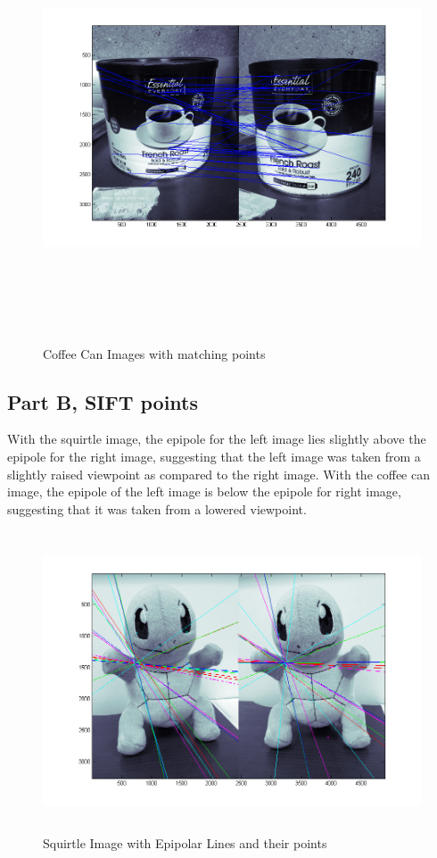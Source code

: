 \documentclass[11pt,psfig]{article}
\begin{document}
\begin{figure}[H]
\centering
\includegraphics[height=5in]{coffeeCan_prob2Matches2.png}
\caption{Coffee Can Images with matching points}
\label{p2f}
\end{figure}

\newpage

\subsection*{Part B, SIFT points}

With the squirtle image, the epipole for the left image lies slightly above the epipole for the right image, suggesting that the left image was taken from a slightly raised viewpoint as compared to the right image. With the coffee can image, the epipole of the left image is below the epipole for right image, suggesting that it was taken from a lowered viewpoint. 

\begin{figure}[H]
\centering
\includegraphics[height=3.5in]{squirtle_prob2Epipolar2.png}
\caption{Squirtle Image with Epipolar Lines and their points}
\label{p2g}
\end{figure}
\end{document}
